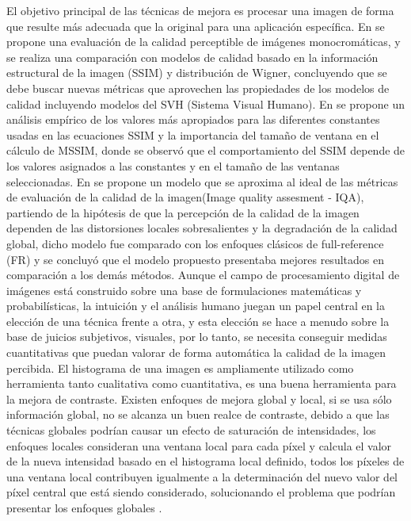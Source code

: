 \documentclass[spanish,twocolumn]{article}
\begin{document}

El objetivo principal de las técnicas de mejora es procesar una imagen de forma que resulte más adecuada que la original para una aplicación específica. 
En \cite{toolperceptualquality} se propone una evaluación de la calidad perceptible de imágenes monocromáticas, y se realiza una comparación con modelos de calidad basado en la información estructural de la imagen (SSIM) y distribución de Wigner, concluyendo que se debe buscar nuevas métricas que aprovechen las propiedades de los modelos de calidad incluyendo modelos del SVH (Sistema Visual Humano).
En \cite{ssimparametersandwindowsiz} se propone un análisis empírico de los valores más apropiados para las diferentes constantes usadas en las ecuaciones SSIM y la importancia del tamaño de ventana en el cálculo de MSSIM, donde se observó que el comportamiento del SSIM depende de los valores asignados a las constantes y en el tamaño de las ventanas seleccionadas.
En \cite{ltg2014} se propone un modelo que se aproxima al ideal de las métricas de evaluación de la calidad de la imagen(Image quality assesment - IQA), partiendo de la hipótesis de que la percepción de la calidad de la imagen dependen de las distorsiones locales sobresalientes y la degradación de la calidad global, dicho modelo fue comparado con los enfoques clásicos de full-reference (FR) y se concluyó que el modelo propuesto presentaba mejores resultados en comparación a los demás métodos.
Aunque el campo de procesamiento digital de imágenes está construido sobre una base de formulaciones matemáticas y probabilísticas, la intuición y el análisis humano juegan un papel central en la elección de una técnica frente a otra, y esta elección se hace a menudo sobre la base de juicios subjetivos, visuales, por lo tanto, se necesita conseguir medidas cuantitativas que puedan valorar de forma automática la calidad de la imagen percibida.
El histograma de una imagen es ampliamente utilizado como herramienta tanto cualitativa como cuantitativa, es una buena herramienta para la mejora de contraste. Existen enfoques de mejora global y local, si se usa sólo información global, no se alcanza un buen realce de contraste, debido a que las técnicas globales podrían causar un efecto de saturación de intensidades, los enfoques locales consideran una ventana local para cada píxel y calcula el valor de la nueva intensidad basado en el histograma local definido, todos los píxeles de una ventana local contribuyen igualmente a la determinación del nuevo valor del píxel central que está siendo considerado, solucionando el problema que podrían presentar los enfoques globales  \cite{1419470}.
\end{document}
